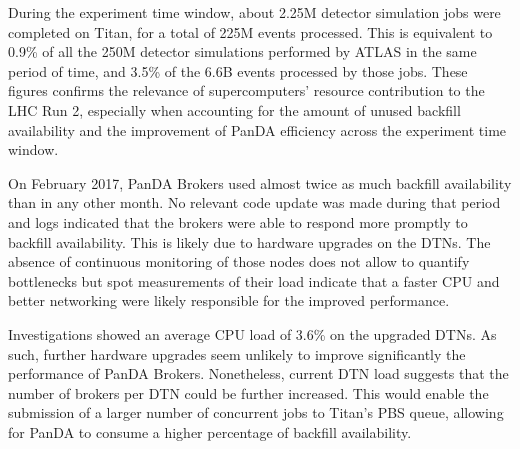 

During the experiment time window, about 2.25M detector simulation jobs were
completed on Titan, for a total of 225M events processed. This is equivalent to
0.9\% of all the 250M detector simulations performed by ATLAS in the same period
of time, and 3.5\% of the 6.6B events processed by those jobs.
These figures confirms the relevance of supercomputers' resource contribution to
the LHC Run 2, especially when accounting for the amount of unused backfill
availability and the improvement of PanDA efficiency across the experiment time
window.


On February 2017, PanDA Brokers used almost twice as much backfill availability
than in any other month. No relevant code update was made during that period and
logs indicated that the brokers were able to respond more promptly to backfill
availability. This is likely due to hardware upgrades on the DTNs. The absence
of continuous monitoring of those nodes does not allow to quantify bottlenecks
but spot measurements of their load indicate that a faster CPU and better
networking were likely responsible for the improved performance.

Investigations showed an average CPU load of 3.6\% on the upgraded DTNs. As
such, further hardware upgrades seem unlikely to improve significantly the
performance of PanDA Brokers. Nonetheless, current DTN load suggests that the
number of brokers per DTN could be further increased. This would enable the
submission of a larger number of concurrent jobs to Titan's PBS queue, allowing
for PanDA to consume a higher percentage of backfill availability.

